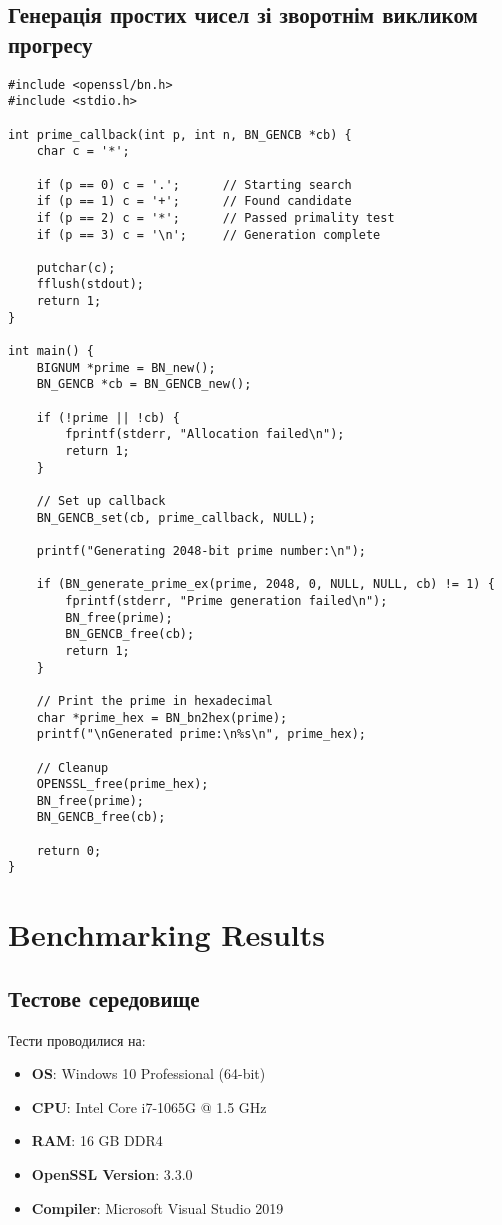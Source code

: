 \subsection{Генерація простих чисел зі зворотнім викликом прогресу}

\begin{verbatim}
#include <openssl/bn.h>
#include <stdio.h>

int prime_callback(int p, int n, BN_GENCB *cb) {
    char c = '*';
    
    if (p == 0) c = '.';      // Starting search
    if (p == 1) c = '+';      // Found candidate
    if (p == 2) c = '*';      // Passed primality test
    if (p == 3) c = '\n';     // Generation complete
    
    putchar(c);
    fflush(stdout);
    return 1;
}

int main() {
    BIGNUM *prime = BN_new();
    BN_GENCB *cb = BN_GENCB_new();
    
    if (!prime || !cb) {
        fprintf(stderr, "Allocation failed\n");
        return 1;
    }
    
    // Set up callback
    BN_GENCB_set(cb, prime_callback, NULL);
    
    printf("Generating 2048-bit prime number:\n");
    
    if (BN_generate_prime_ex(prime, 2048, 0, NULL, NULL, cb) != 1) {
        fprintf(stderr, "Prime generation failed\n");
        BN_free(prime);
        BN_GENCB_free(cb);
        return 1;
    }
    
    // Print the prime in hexadecimal
    char *prime_hex = BN_bn2hex(prime);
    printf("\nGenerated prime:\n%s\n", prime_hex);
    
    // Cleanup
    OPENSSL_free(prime_hex);
    BN_free(prime);
    BN_GENCB_free(cb);
    
    return 0;
}
\end{verbatim}

\section{Benchmarking Results}

\subsection{Тестове середовище}
Тести проводилися на:
\begin{itemize}
    \item \textbf{OS}: Windows 10 Professional (64-bit)
    \item \textbf{CPU}: Intel Core i7-1065G @ 1.5 GHz
    \item \textbf{RAM}: 16 GB DDR4
    \item \textbf{OpenSSL Version}: 3.3.0
    \item \textbf{Compiler}: Microsoft Visual Studio 2019
\end{itemize}

